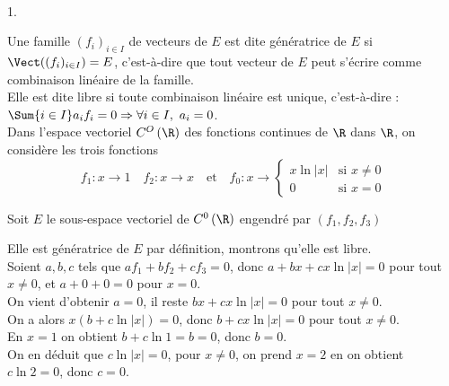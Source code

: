 \documentclass[11pt]{article}%
\begin{document}
 \begin{exercice} \indent \\
 \begin{noliste}{1.}
 \setlength{\itemsep}{4mm}
 \item Une famille $(f_{i})_{i \in I}$ de vecteurs de $E$ est dite
génératrice de $E$ si $\Vect ( (f_{i})_{i \in I} ) = E$, c'est-à-dire
que tout vecteur de $E$ peut s'écrire comme combinaison linéaire de la
famille. \\
 Elle est dite libre si toute combinaison linéaire est unique,
c'est-à-dire : $\Sum{i \in I} a_{i} f_{i} = 0 \Rightarrow \forall i \in
I,\ a_{i} = 0$. \\

 \hspace{-1cm}Dans l'espace vectoriel $C^{O}\left( \R\right) $ des
 fonctions continues de $\R$ dans $\R$, on considère les
 trois fonctions 
\[
 f_{1} :x\rightarrow 1\quad f_{2} :x\rightarrow x\quad \text{et}
 \quad f_{0} :x\rightarrow \left\{ 
\begin{array}{cc}
 x\ln \left| x\right| & \text{si }x\neq 0 \\
 0 & \text{si }x = 0
\end{array}
\right. 
\]



 \hspace{-1cm}Soit $E$ le sous-espace vectoriel de $C^{0}\left( \R
\right) $ engendré par $\left( f_{1},f_{2},f_{3}\right) $

 \item Elle est génératrice de $E$ par définition, montrons qu'elle est
libre. \\
 Soient $a, b,c$ tels que $a f_{1} + b f_{2} + c f_{3} = 0$, donc $a +
b x + c x \ln | x | = 0$ pour tout $x \neq 0$, et $a + 0 + 0 = 0$ pour
$x = 0$. \\
 On vient d'obtenir $a = 0$, il reste $b x + c x \ln | x | = 0$ pour
tout $x \neq 0$. \\
 On a alors $x ( b + c \ln | x |) = 0$, donc $b + c x \ln | x | = 0$
pour tout $x \neq 0$. \\
 En $x = 1$ on obtient $b + c \ln 1 = b = 0$, donc $b = 0$. \\
 On en déduit que $c \ln | x | = 0$, pour $x \neq 0$, on prend $x = 2$
en on obtient $c \ln 2 = 0$, donc $c = 0$. \\


\end{noliste}
\end{exercice}
\end{document}
